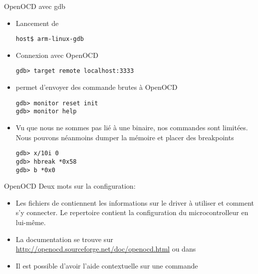 \begin{frame}[fragile=singleslide]{OpenOCD avec gdb}
  \begin{itemize}
  \item Lancement de 
    \begin{lstlisting}
host$ arm-linux-gdb
    \end{lstlisting}
  \item Connexion avec OpenOCD
    \begin{lstlisting}
gdb> target remote localhost:3333
    \end{lstlisting}
  \item {} permet d'envoyer des commande brutes à OpenOCD
    \begin{lstlisting}
gdb> monitor reset init
gdb> monitor help
    \end{lstlisting}
  \item Vu  que nous ne  sommes pas lié  à une binaire,  nos commandes
    sont limitées. Nous pouvons  néanmoins dumper la mémoire et placer
    des breakpoints
    \begin{lstlisting}
gdb> x/10i 0
gdb> hbreak *0x58
gdb> b *0x0
    \end{lstlisting}
  \end{itemize}
\end{frame}

\begin{frame}[fragile=singleslide]{OpenOCD}
  Deux mots sur la configuration:
  \begin{itemize}
  \item   Les   fichiers   de      contiennent   les
    informations sur le driver à utiliser et comment s'y connecter. Le
    repertoire       contient   la    configuration   du
    microcontrolleur en lui-même.
  \item        La       documentation       se        trouve       sur
    \url{http://openocd.sourceforge.net/doc/openocd.html}    ou   dans
  \item Il  est possible d'avoir l'aide contextuelle  sur une commande
  \end{itemize}
\end{frame}


